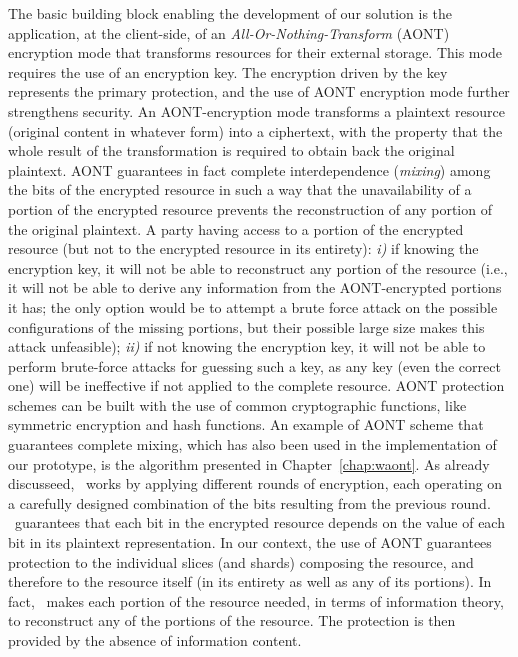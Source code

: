 The basic building block enabling the development of our solution is
the application, at the client-side, of an {\em
  All-Or-Nothing-Transform\/} (AONT) encryption mode that transforms
resources for their external storage.  This mode requires the use of
an encryption key. The encryption driven by the key represents the
primary protection, and the use of AONT encryption mode further
strengthens security. An AONT-encryption mode transforms a plaintext
resource (original content in whatever form) into a ciphertext, with
the property that the whole result of the transformation is required
to obtain back the original plaintext. AONT guarantees in fact
complete interdependence ({\em mixing\/}) among the bits of the
encrypted resource in such a way that the unavailability of a portion
of the encrypted resource prevents the reconstruction of any portion
of the original plaintext. A party having access to a portion of the
encrypted resource (but not to the encrypted resource in its
entirety): {\em i)\/} if knowing the encryption key, it will not be able
to reconstruct any portion of the resource (i.e., it will not be able
to derive any information from the AONT-encrypted portions it has; the
only option would be to attempt a brute force attack on the possible
configurations of the missing portions, but their possible large size
makes this attack unfeasible); {\em ii)\/} if not knowing the
encryption key, it will not be able to perform brute-force attacks for
guessing such a key, as any key (even the correct one) will be
ineffective if not applied to the complete resource.  AONT protection
schemes can be built with the use of common cryptographic functions,
like symmetric encryption and hash functions.  An example of AONT
scheme that guarantees complete mixing, which has also been used in
the implementation of our prototype, is the
\name algorithm presented in Chapter~\ref{chap:waont}. As already discusseed, \name\ works by applying
different rounds of encryption, each operating on a carefully designed combination of the bits resulting from the previous round.
\name\ guarantees that each bit in the encrypted
resource depends on the value of each bit in its plaintext
representation.  In our context, the use of AONT guarantees protection
to the individual slices (and shards) composing the resource, and
therefore to the resource itself (in its entirety as well as any of
its portions). In fact, \name\ makes each portion of the resource
needed, in terms of information theory, to reconstruct any of the
portions of the resource. The protection is then provided by the
absence of information content.

